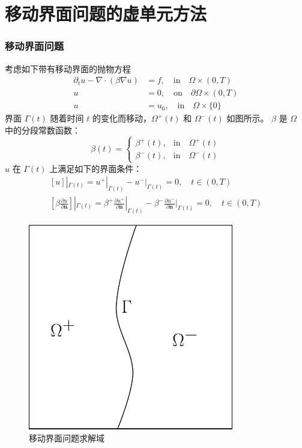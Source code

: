 \documentclass[notheorems,serif]{beamer}
\begin{document}
\section{移动界面问题的虚单元方法}
\begin{frame}
    \frametitle{移动界面问题}
\begin{minipage}[b]{0.6\linewidth}
\small{
考虑如下带有移动界面的抛物方程
$$
\begin{aligned}
    \partial_t u - \nabla \cdot (\beta \nabla u) & = f, \quad \text{in} \quad \Omega \times (0, T)\\
    u & = 0, \quad \text{on} \quad \partial \Omega \times (0, T)\\
    u & = u_0, \quad \text{in} \quad \Omega \times \{0\}
\end{aligned}
$$
界面 $\Gamma(t)$ 随着时间 $t$ 的变化而移动，$\Omega^+(t)$ 和 $\Omega^-(t)$
如图所示。
$\beta$ 是 $\Omega$ 中的分段常数函数：
$$
\beta(t) = 
\begin{cases}
    \beta^+(t), & \text{in} \quad \Omega^+(t)\\
    \beta^-(t), & \text{in} \quad \Omega^-(t)
\end{cases}
$$
$u$ 在 $\Gamma(t)$ 上满足如下的界面条件： 
$$
\begin{aligned}
    [u]|_{\Gamma(t)} = u^+|_{\Gamma(t)} - u^-|_{\Gamma(t)} = 0, \quad t\in (0,
    T)\\
[\beta \frac{\partial u}{\partial \boldsymbol{n}}]|_{\Gamma(t)} =
\beta^+\frac{\partial u^+}{\partial \boldsymbol{n}}|_{\Gamma(t)}
-
\beta^-\frac{\partial u^-}{\partial \boldsymbol{n}}|_{\Gamma(t)} = 0, \quad t\in (0, T)
\end{aligned}
$$
}
\end{minipage}
\hfill
\begin{minipage}[b]{0.38\linewidth}
\centering
\begin{figure}[htpb]
    \centering
    \includegraphics[width=0.8\textwidth]{../figures/interface_prob.pdf}
    \caption{移动界面问题求解域}
\end{figure}
\vspace{25pt}
\end{minipage}

\end{frame}
\end{document}
